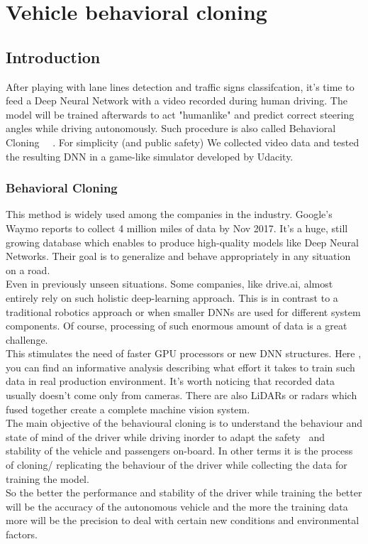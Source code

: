 \chapter{Vehicle behavioral cloning}

\section{Introduction}
After playing with lane lines detection and traffic signs classifcation, it's time to feed a Deep Neural Network with a video recorded during human driving. The model will be trained afterwards to act "humanlike" and predict correct steering angles while driving autonomously. Such procedure is also called Behavioral Cloning~\cite{8345542} ~\cite{farag2018behavior}. For simplicity (and public safety) We collected video data and tested the resulting DNN in a game-like simulator developed by Udacity. 


\subsection{Behavioral Cloning}
This method is widely used among the companies in the industry. Google's Waymo reports to collect 4 million miles of data by Nov 2017. It's a huge, still growing database which enables to produce high-quality models like Deep Neural Networks. Their goal is to generalize and behave appropriately in any situation on a road.\\

Even in previously unseen situations. Some companies, like drive.ai, almost entirely rely on such holistic deep-learning approach. This is in contrast to a traditional robotics approach or when smaller DNNs are used for different system components. Of course, processing of such enormous amount of data is a great challenge. \\

This stimulates the need of faster GPU processors or new DNN structures. Here , you can find an informative analysis describing what effort it takes to train such data in real production environment. It's worth noticing that recorded data usually doesn't come only from cameras. There are also LiDARs or radars which fused together create a complete machine vision system.\\

The main objective of the behavioural cloning is to understand the behaviour and state of mind of the driver while driving inorder to adapt the safety~\cite{4153054} and stability of the vehicle and passengers on-board. In other terms it is the process of cloning/ replicating the behaviour of the driver while collecting the data for training the model.\\

So the better the performance and stability of the driver while training the better will be the accuracy of the autonomous vehicle and the more the training data more will be the precision to deal with certain new conditions and environmental factors.


